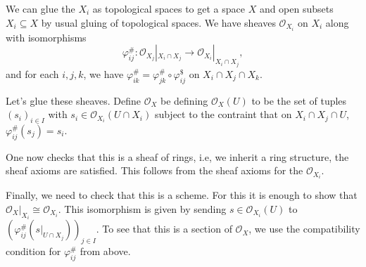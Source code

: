 We can glue the $X_i$ as topological spaces to get a space $X$ and open subsets
$X_i \subseteq X$ by usual gluing of topological spaces. We have sheaves
$\mathcal{O}_{X_i}$ on $X_i$ along with isomorphisms
\[ \varphi_{ij}^\#\colon \mathcal{O}_{X_j}|_{X_i\cap X_j}\to \mathcal{O}_{X_i}|_{X_i\cap X_j}, \]
and for each $i, j, k$, we have $\varphi_{ik}^\# = \varphi_{jk}^\# \circ \varphi_{ij}^\$$ on
$X_i\cap X_j\cap X_k$.

Let's glue these sheaves. Define $\mathcal{O}_X$ be defining
$\mathcal{O}_X(U)$ to be the set of tuples $(s_i)_{i \in I}$ with $s_i \in \mathcal{O}_{X_i}(U\cap X_i)$
subject to the contraint that on $X_i\cap X_j \cap U$, $\varphi_{ij}^\#(s_j) = s_i$.

One now checks that this is a sheaf of rings, i.e, we inherit a ring structure, the
sheaf axioms are satisfied. This follows from the sheaf axioms for the $\mathcal{O}_{X_i}$.

Finally, we need to check that this is a scheme. For this it is enough to show that
$\mathcal{O}_X|_{X_i}\cong \mathcal{O}_{X_i}$. This isomorphism is given by sending
$s \in \mathcal{O}_{X_i}(U)$ to $(\varphi_{ij}^\#(s|_{U\cap X_j}))_{j \in I}$.
To see that this is a section of $\mathcal{O}_X$, we use the compatibility
condition for $\varphi_{ij}^\#$ from above.
